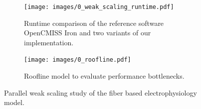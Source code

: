 \begin{figure}[H]
  \centering%
  \begin{subfigure}[t]{0.48\textwidth}%
    \centering%
    \texttt{[image: images/0\_weak\_scaling\_runtime.pdf]} %
    \caption{Runtime comparison of the reference software OpenCMISS Iron and two variants of our implementation.}%
    \label{fig:strong_scaling_runtime}%
  \end{subfigure}
  \hfill
  \begin{subfigure}[t]{0.5\textwidth}%
    \centering%
    \texttt{[image: images/0\_roofline.pdf]}%
    \caption{Roofline model to evaluate performance bottlenecks.}%
    \label{fig:0_roofline}%
  \end{subfigure}   
  \caption{Parallel weak scaling study of the fiber based electrophysiology model.}%
  \label{fig:weak_scaling}%
\end{figure}%

